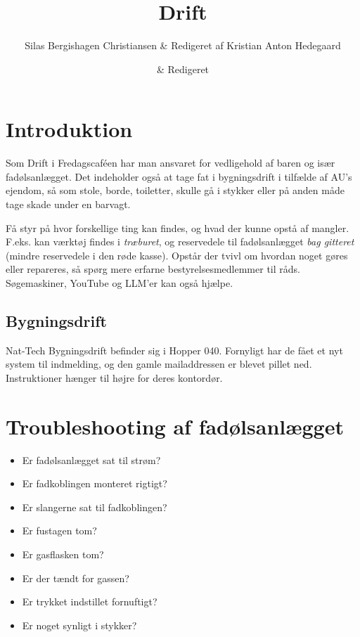 

\title{Drift}
\author{Silas Bergishagen Christiansen \& Redigeret af Kristian Anton Hedegaard}
\date{ \& Redigeret }



\maketitle

\section{Introduktion}

Som Drift i Fredagscaféen har man ansvaret for vedligehold af baren og især fadølsanlægget. Det indeholder også at tage fat i bygningsdrift i tilfælde af AU's ejendom, så som stole, borde, toiletter, skulle gå i stykker eller på anden måde tage skade under en barvagt.

Få styr på hvor forskellige ting kan findes, og hvad der kunne opstå af mangler. F.eks. kan værktøj findes i \textit{træburet}, og reservedele til fadølsanlægget \textit{bag gitteret} (mindre reservedele i den røde kasse). Opstår der tvivl om hvordan noget gøres eller repareres, så spørg mere erfarne bestyrelsesmedlemmer til råds. Søgemaskiner, YouTube og LLM'er kan også hjælpe.

\subsection{Bygningsdrift}

Nat-Tech Bygningsdrift befinder sig i Hopper 040. Fornyligt har de fået et nyt system til indmelding, og den gamle mailaddressen er blevet pillet ned. Instruktioner hænger til højre for deres kontordør.

\section{Troubleshooting af fadølsanlægget}

\begin{itemize}
    \item Er fadølsanlægget sat til strøm?
    \item Er fadkoblingen monteret rigtigt?
    \item Er slangerne sat til fadkoblingen?
    \item Er fustagen tom?
    \item Er gasflasken tom?
    \item Er der tændt for gassen?
    \item Er trykket indstillet fornuftigt?
    \item Er noget synligt i stykker?
\end{itemize}

